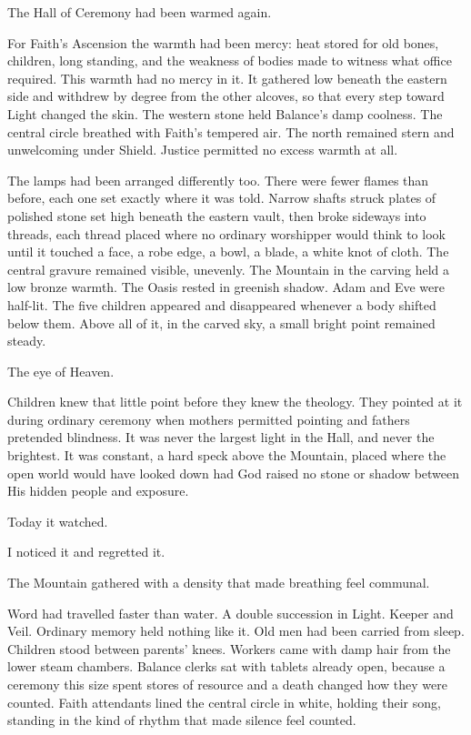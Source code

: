 The Hall of Ceremony had been warmed again.\par
For Faith's Ascension the warmth had been mercy: heat stored for old bones, children, long standing, and the weakness of bodies made to witness what office required.
This warmth had no mercy in it.
It gathered low beneath the eastern side and withdrew by degree from the other alcoves, so that every step toward Light changed the skin.
The western stone held Balance's damp coolness.
The central circle breathed with Faith's tempered air.
The north remained stern and unwelcoming under Shield.
Justice permitted no excess warmth at all.\par
The lamps had been arranged differently too.
There were fewer flames than before, each one set exactly where it was told.
Narrow shafts struck plates of polished stone set high beneath the eastern vault, then broke sideways into threads, each thread placed where no ordinary worshipper would think to look until it touched a face, a robe edge, a bowl, a blade, a white knot of cloth.
The central gravure remained visible, unevenly.
The Mountain in the carving held a low bronze warmth.
The Oasis rested in greenish shadow.
Adam and Eve were half-lit.
The five children appeared and disappeared whenever a body shifted below them.
Above all of it, in the carved sky, a small bright point remained steady.\par
The eye of Heaven.\par
Children knew that little point before they knew the theology.
They pointed at it during ordinary ceremony when mothers permitted pointing and fathers pretended blindness.
It was never the largest light in the Hall, and never the brightest.
It was constant, a hard speck above the Mountain, placed where the open world would have looked down had God raised no stone or shadow between His hidden people and exposure.\par
Today it watched.\par
I noticed it and regretted it.\par
The Mountain gathered with a density that made breathing feel communal.\par
Word had travelled faster than water.
A double succession in Light.
Keeper and Veil.
Ordinary memory held nothing like it.
Old men had been carried from sleep.
Children stood between parents' knees.
Workers came with damp hair from the lower steam chambers.
Balance clerks sat with tablets already open, because a ceremony this size spent stores of resource and a death changed how they were counted.
Faith attendants lined the central circle in white, holding their song, standing in the kind of rhythm that made silence feel counted.
